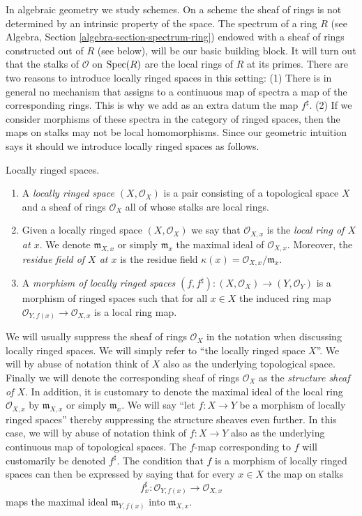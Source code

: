 \medskip\noindent
In algebraic geometry we study schemes. On a scheme the sheaf of rings
is not determined by an intrinsic property of the space.
The spectrum of a ring $R$
(see Algebra, Section \ref{algebra-section-spectrum-ring}) endowed
with a sheaf of rings constructed out of $R$ (see below),
will be our basic building block. It will turn out that
the stalks of $\mathcal{O}$ on $\mathop{\mathrm{Spec}}(R)$ are the local
rings of $R$ at its primes. There are two reasons to introduce
locally ringed spaces in this setting: (1) There is in general
no mechanism that assigns to a continuous map of spectra a
map of the corresponding rings. This is why we add as an extra datum
the map $f^\sharp$. (2) If we consider morphisms
of these spectra in the category of ringed spaces, then the
maps on stalks may not be local homomorphisms. Since our
geometric intuition says it should we introduce locally ringed spaces
as follows.

\begin{definition}
\label{definition-locally-ringed-space}
Locally ringed spaces.
\begin{enumerate}
\item A {\it locally ringed space $(X, \mathcal{O}_X)$}
is a pair consisting of a
topological space $X$ and a sheaf of rings $\mathcal{O}_X$ all of whose stalks
are local rings.
\item Given a locally ringed space $(X, \mathcal{O}_X)$ we say that
$\mathcal{O}_{X, x}$ is the {\it local ring of $X$ at $x$}.
We denote $\mathfrak{m}_{X, x}$ or simply $\mathfrak{m}_x$
the maximal ideal of $\mathcal{O}_{X, x}$. Moreover, the
{\it residue field of $X$ at $x$} is the residue field
$\kappa(x) = \mathcal{O}_{X, x}/\mathfrak{m}_x$.
\item A {\it morphism of locally ringed spaces}
$(f, f^\sharp) : (X, \mathcal{O}_X) \to (Y, \mathcal{O}_Y)$
is a morphism of ringed spaces such that for all $x \in X$
the induced ring map $\mathcal{O}_{Y, f(x)} \to \mathcal{O}_{X, x}$ is a
local ring map.
\end{enumerate}
\end{definition}

\noindent
We will usually suppress the sheaf of rings $\mathcal{O}_X$
in the notation when discussing locally ringed spaces. We will
simply refer to ``the locally ringed space $X$''.
We will by abuse of notation think of $X$ also as
the underlying topological space. Finally we will denote
the corresponding sheaf of rings
$\mathcal{O}_X$ as the {\it structure sheaf of $X$}.
In addition, it is customary to denote the maximal ideal
of the local ring $\mathcal{O}_{X, x}$ by
$\mathfrak{m}_{X, x}$ or simply $\mathfrak{m}_x$.
We will say ``let $f : X \to Y$ be a morphism of locally ringed
spaces'' thereby suppressing the structure sheaves even further.
In this case, we will by abuse of notation think of $f : X\to Y$
also as the underlying continuous map of topological spaces.
The $f$-map corresponding to $f$ will customarily
be denoted $f^\sharp$. The condition that $f$ is a morphism
of locally ringed spaces can then be expressed by saying that
for every $x\in X$ the map on stalks
$$
f^\sharp_x : \mathcal{O}_{Y, f(x)} \longrightarrow \mathcal{O}_{X, x}
$$
maps the maximal ideal $\mathfrak m_{Y, f(x)}$ into
$\mathfrak m_{X, x}$.

